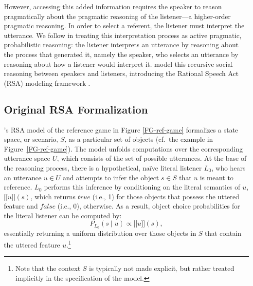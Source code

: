 \documentclass[11pt,a4paper]{article}
\newcommand{\sem}[1]{\mbox{$[\![$#1$]\!]$}}
\begin{document}
However, accessing this added information requires the speaker to reason pragmatically about the pragmatic reasoning of the listener---a higher-order pragmatic reasoning.
In order to select a referent, the listener must interpret the utterance. We follow  in treating this interpretation process as active pragmatic, probabilistic reasoning: the listener interprets an utterance by reasoning about the process that generated it, namely the speaker, who selects an utterance by reasoning about how a listener would interpret it. \citeauthor{frankgoodman2012} model this recursive social reasoning between speakers and listeners, introducing the Rational Speech Act (RSA) modeling framework \cite{frankgoodman2012,frankejaeger2016,goodmanfrank2016}.

\subsection{Original RSA Formalization} \label{rsa}

\citeauthor{frankgoodman2012}'s RSA model of the reference game in Figure \ref{FG-ref-game} formalizes a state space, or scenario, $S$, as a particular set of objects (cf.~the example in Figure~\ref{FG-ref-game}). 
The model unfolds computations over the corresponding utterance space $U$, which consists of the set of possible utterances. %
At the base of the reasoning process, there is a hypothetical, na\"ive literal listener $L_0$, who hears an utterance $u\in U$ and attempts to infer the object $s \in S$ that $u$ is meant to reference. 
$L_0$ performs this inference by conditioning on the literal semantics of $u$, \sem{$u$}$(s)$, which returns $true$ (i.e., 1) for those objects that possess the uttered feature and $false$ (i.e., 0), otherwise.
As a result, object choice probabilities for the literal listener can be computed by: 
\begin{equation}
P_{L_{0}}(s\mid u) \propto \sem{$u$}(s),
\end{equation}
essentially returning a uniform distribution over those objects in $S$ that contain the uttered feature $u$.\footnote{Note that the context $S$ is typically not made explicit, but rather treated implicitly in the specification of the model.}
\end{document}
